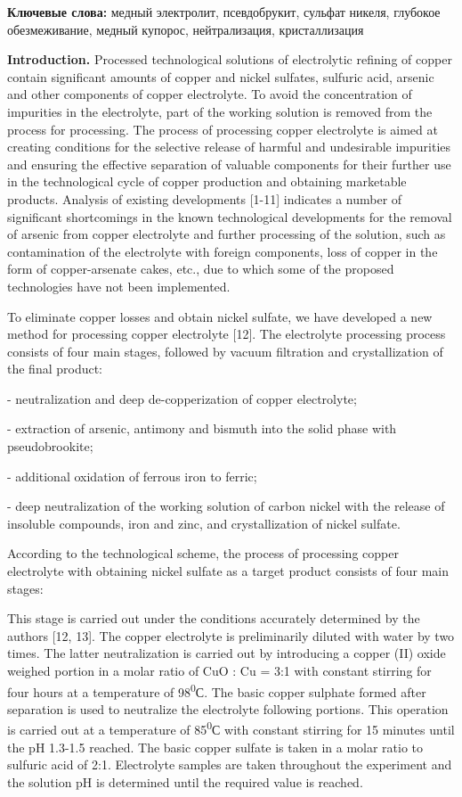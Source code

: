 {\bfseries Ключевые слова:} медный электролит, псевдобрукит, сульфат
никеля, глубокое обезмеживание, медный купорос, нейтрализация,
кристаллизация

{\bfseries Introduction.} Processed technological solutions of electrolytic
refining of copper contain significant amounts of copper and nickel
sulfates, sulfuric acid, arsenic and other components of copper
electrolyte. To avoid the concentration of impurities in the
electrolyte, part of the working solution is removed from the process
for processing. The process of processing copper electrolyte is aimed at
creating conditions for the selective release of harmful and undesirable
impurities and ensuring the effective separation of valuable components
for their further use in the technological cycle of copper production
and obtaining marketable products. Analysis of existing developments
{[}1-11{]} indicates a number of significant shortcomings in the known
technological developments for the removal of arsenic from copper
electrolyte and further processing of the solution, such as
contamination of the electrolyte with foreign components, loss of copper
in the form of copper-arsenate cakes, etc., due to which some of the
proposed technologies have not been implemented.

To eliminate copper losses and obtain nickel sulfate, we have developed
a new method for processing copper electrolyte {[}12{]}. The electrolyte
processing process consists of four main stages, followed by vacuum
filtration and crystallization of the final product:

- neutralization and deep de-copperization of copper electrolyte;

- extraction of arsenic, antimony and bismuth into the solid phase with
pseudobrookite;

- additional oxidation of ferrous iron to ferric;

- deep neutralization of the working solution of carbon nickel with the
release of insoluble compounds, iron and zinc, and crystallization of
nickel sulfate.

According to the technological scheme, the process of processing copper
electrolyte with obtaining nickel sulfate as a target product consists
of four main stages:

This stage is carried out under the conditions accurately determined by
the authors {[}12, 13{]}. The copper electrolyte is preliminarily
diluted with water by two times. The latter neutralization is carried
out by introducing a copper (II) oxide weighed portion in a molar ratio
of CuO : Cu = 3:1 with constant stirring for four hours at a temperature
of 98\textsuperscript{0}С. The basic copper sulphate formed after
separation is used to neutralize the electrolyte following portions.
This operation is carried out at a temperature of 85\textsuperscript{0}С
with constant stirring for 15 minutes until the pH 1.3-1.5 reached. The
basic copper sulfate is taken in a molar ratio to sulfuric acid of 2:1.
Electrolyte samples are taken throughout the experiment and the solution
pH is determined until the required value is reached.

